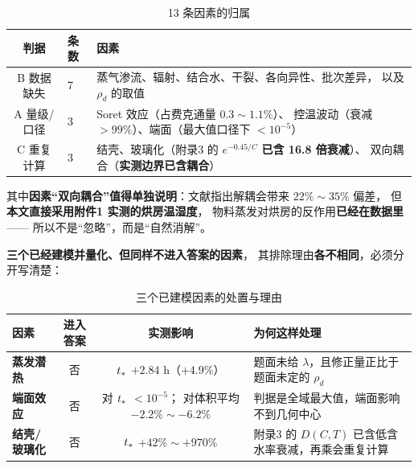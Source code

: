 \begin{table}[H]
  \centering
  \caption{13 条因素的归属}
  \label{tab:13}
  \footnotesize
  \begin{tabularx}{\textwidth}{@{}clX@{}}
    \toprule
    判据 & 条数 & 因素 \\
    \midrule
    B 数据缺失 & 7
      & 蒸气渗流、辐射、结合水、干裂、各向异性、批次差异，
        以及 $\rho_d$ 的取值 \\
    A 量级/口径 & 3
      & Soret 效应（占费克通量 $0.3\sim1.1\%$）、
        控温波动（衰减 $>99\%$）、端面（最大值口径下 $<10^{-5}$） \\
    C 重复计算 & 3
      & 结壳、玻璃化（附录3 的 $e^{-0.45/C}$ \textbf{已含 16.8 倍衰减}）、
        双向耦合（\textbf{实测边界已含耦合}） \\
    \bottomrule
  \end{tabularx}
\end{table}

其中\textbf{因素``双向耦合''值得单独说明}：文献指出解耦会带来 $22\%\sim35\%$ 偏差，
但\textbf{本文直接采用附件1 实测的烘房温湿度}，
物料蒸发对烘房的反作用\textbf{已经在数据里}——
所以不是``忽略''，而是``自然消解''。

\textbf{三个已经建模并量化、但同样不进入答案的因素}，
其排除理由\textbf{各不相同}，必须分开写清楚：

\begin{table}[H]
  \centering
  \caption{三个已建模因素的处置与理由}
  \label{tab:3factors}
  \footnotesize
  \begin{tabularx}{\textwidth}{@{}lccX@{}}
    \toprule
    因素 & 进入答案 & 实测影响 & 为何这样处理 \\
    \midrule
    \textbf{蒸发潜热} & 否 & $t_{*}$ $+2.84$ h（$+4.9\%$）
      & 题面未给 $\lambda$，且修正量正比于题面未定的 $\rho_d$ \\
    \textbf{端面效应} & 否 & 对 $t_{*}$ $<10^{-5}$；
        对体积平均 $-2.2\%\sim-6.2\%$
      & 判据是全域最大值，端面影响不到几何中心 \\
    \textbf{结壳/玻璃化} & 否 & $t_{*}$ $+42\%\sim+970\%$
      & 附录3 的 $D(C,T)$ 已含低含水率衰减，再乘会重复计算 \\
    \bottomrule
  \end{tabularx}
\end{table}
